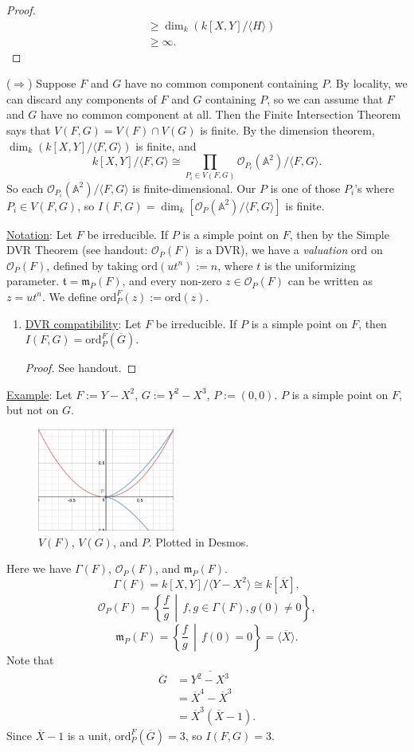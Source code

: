 \documentclass[12pt]{article}
\newcommand{\ita}[1]{\textit{#1}}
\newcommand{\vbrack}[1]{\langle #1\rangle}
\theoremstyle{definition}
\begin{document}
\begin{enumerate}
\begin{proof}
\begin{align*}
            &\geq\dim_k(k[X,Y]/\vbrack{H})\\
            &\geq\infty.
        \end{align*}
    \end{proof}
    ($\Rightarrow$) Suppose $F$ and $G$ have no common component containing $P$. By locality, we can discard any components of $F$ and $G$ containing $P$, so we can assume that $F$ and $G$ have no common component at all. Then the Finite Intersection Theorem says that $V(F,G)=V(F)\cap V(G)$ is finite. By the dimension theorem, $\dim_k(k[X,Y]/\vbrack{F,G})$ is finite, and
    \[k[X,Y]/\vbrack{F,G}\cong\prod\limits_{P_i\in V(F,G)}\mathcal{O}_{P_i}(\mathbb{A}^2)/\vbrack{F,G}.\]
    So each $\mathcal{O}_{P_i}(\mathbb{A}^2)/\vbrack{F,G}$ is finite-dimensional. Our $P$ is one of those $P_i$'s where $P_i\in V(F,G)$, so $I(F,G)=\dim_k[\mathcal{O}_P(\mathbb{A}^2)/\vbrack{F,G}]$ is finite.
\end{enumerate}
\underline{Notation}: Let $F$ be irreducible. If $P$ is a simple point on $F$, then by the Simple DVR Theorem (see handout: $\mathcal{O}_P(F)$ is a DVR), we have a \ita{valuation} $\mathrm{ord}$ on $\mathcal{O}_P(F)$, defined by taking $\mathrm{ord}(ut^n):=n$, where $t$ is the uniformizing parameter. $\mathfrak{t}=\mathfrak{m}_P(F)$, and every non-zero $z\in\mathcal{O}_P(F)$ can be written as $z=ut^n$. We define $\mathrm{ord}_P^F(z):=\mathrm{ord}(z)$. 
\begin{enumerate}[resume]
    \item \underline{DVR compatibility}: Let $F$ be irreducible. If $P$ is a simple point on $F$, then $I(F,G)=\mathrm{ord}_P^F(\overline{G})$.
    \begin{proof}
        See handout.
    \end{proof}
\end{enumerate}
\underline{Example}: Let $F:=Y-X^2$, $G:=Y^2-X^3$, $P:=(0,0)$. $P$ is a simple point on $F$, but not on $G$. 
\begin{figure}[H]
    \centering
    \includegraphics[width=0.4\textwidth]{24.png}
    \caption{$V(F)$, $V(G)$, and $P$. Plotted in Desmos.}
\end{figure}
Here we have $\Gamma(F)$, $\mathcal{O}_P(F)$, and $\mathfrak{m}_P(F)$.
\[\Gamma(F)=k[X,Y]/\vbrack{Y-X^2}\cong k[\overline{X}],\]
\[\mathcal{O}_P(F)=\left\{\frac{f}{g}\,\middle|\,f,g\in\Gamma(F),g(0)\neq0\right\},\]
\[\mathfrak{m}_P(F)=\left\{\frac{f}{g}\,\middle|\,f(0)=0\right\}=\vbrack{\overline{X}}.\]
Note that
\begin{align*}
    \overline{G}&=\overline{Y^2-X^3}\\
    &=\overline{X}^4-\overline{X}^3\\
    &=\overline{X}^3(\overline{X}-1).
\end{align*}
Since $\overline{X}-1$ is a unit, $\mathrm{ord}_P^F(\overline{G})=3$, so $I(F,G)=3$.
\end{document}
